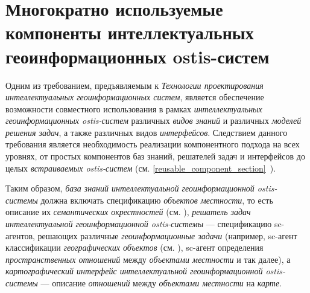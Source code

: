 \section{Многократно используемые компоненты интеллектуальных геоинформационных ostis-систем}
\label{chapter_gis_sec_mic_components}

Одним из требованием, предъявляемым к \textit{Технологии проектирования интеллектуальных геоинформационных систем}, является обеспечение возможности совместного использования в рамках \textit{интеллектуальных геоинформационных ostis-систем} различных \textit{видов знаний} и различных \textit{моделей решения задач}, а также различных видов \textit{интерфейсов}. Следствием данного требования является необходимость реализации компонентного подхода на всех уровнях, от простых компонентов баз знаний, решателей задач и интерфейсов до целых \textit{встраиваемых ostis-систем} (см. \ref{reusable_component_section}~).

Таким образом, \textit{база знаний интеллектуальной геоинформационной ostis-системы} должна включать спецификацию \textit{объектов местности}, то есть описание их \textit{семантических окрестностей} (см. \textit{}), \textit{решатель задач интеллектуальной геоинформационной ostis-системы} --- спецификацию sc-агентов, решающих различные \textit{геоинформационные задачи} (например, sc-агент классификации \textit{географических объектов} (см. \textit{}), sc-агент определения \textit{пространственных отношений} между \textit{объектами местности} и так далее), а \textit{картографический интерфейс интеллектуальной геоинформационной ostis-системы} --- описание \textit{отношений} между \textit{объектами местности} на \textit{карте}.


